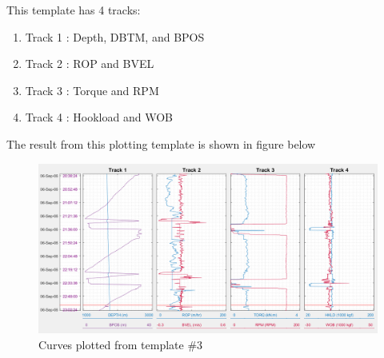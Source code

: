 \documentclass[12pt,a4paper,oneside]{report}
\begin{document}
\noindent This template has 4 tracks:
\begin{enumerate}
\setlength\itemsep{0.1em}
\item Track 1 : Depth, DBTM, and BPOS
\item Track 2 : ROP and BVEL
\item Track 3 : Torque and RPM
\item Track 4 : Hookload and WOB
\end{enumerate}

\noindent The result from this plotting template is shown in figure below
\begin{figure}[H]
\centering
\includegraphics[width=\textwidth]{example3.PNG}
\caption{Curves plotted from template $\#3$}
\end{figure}
\end{document}
